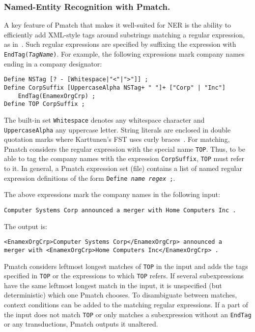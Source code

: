 \documentclass{llncs}
\begin{document}
\subsubsection{Named-Entity Recognition with Pmatch.}
\label{pmatch_for_ner}

A key feature of Pmatch that makes it well-suited for NER is the ability
to efficiently add XML-style tags around substrings matching a regular expression,
as in~\cite{karttunen/2011}. Such regular expressions are
specified by suffixing the expression with
\texttt{EndTag(\textit{TagName})}. For example, the following
expressions mark company names ending in a company designator:

\begin{verbatim}
Define NSTag [? - [Whitespace|"<"|">"]] ;
Define CorpSuffix [UppercaseAlpha NSTag+ " "]+ ["Corp" | "Inc"]
    EndTag(EnamexOrgCrp) ;
Define TOP CorpSuffix ;
\end{verbatim}

\begin{sloppypar}
\noindent
The built-in set \texttt{Whitespace} denotes any whitespace character
and \texttt{UppercaseAlpha} any uppercase letter. String literals are
enclosed in double quotation marks where Karttunen's FST uses curly
braces~\cite{karttunen/2011}.
For matching, Pmatch considers the regular expression with the special
name \texttt{TOP}. Thus, to be able to tag the company names with the
expression \texttt{CorpSuffix}, \texttt{TOP} must refer to it.
In general, a Pmatch expression set (file) contains a list of named
regular expression definitions of the form \texttt{Define
  \textit{name} \textit{regex} ;}.
\end{sloppypar}

The above expressions mark the company names in the following input:
\begin{verbatim}
Computer Systems Corp announced a merger with Home Computers Inc .
\end{verbatim}
\noindent
The output is:
\begin{verbatim}
<EnamexOrgCrp>Computer Systems Corp</EnamexOrgCrp> announced a
merger with <EnamexOrgCrp>Home Computers Inc</EnamexOrgCrp> .
\end{verbatim}

Pmatch considers leftmost longest matches of \texttt{TOP} in the input
and adds the tags specified in \texttt{TOP} or the expressions to
which \texttt{TOP} refers. If several subexpressions have the same leftmost
longest match in the input, it is unspecified (but deterministic)
which one Pmatch
chooses. To disambiguate between matches, context conditions can be
added to the matching regular expressions.
If a part of the input does not match \texttt{TOP} or only matches a
subexpression without an \texttt{EndTag} or any transductions,
Pmatch outputs it unaltered.
\end{document}
